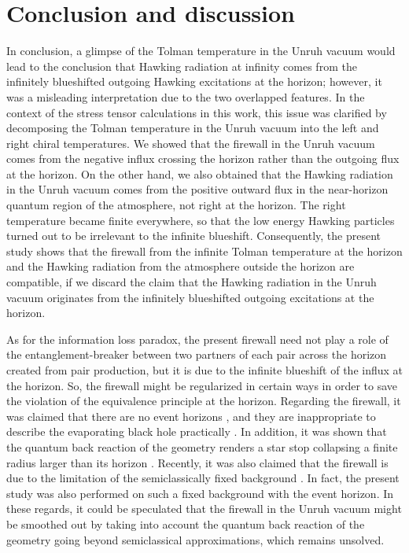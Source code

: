 \documentclass[aps,a4paper,showpacs,showkeys,superscriptaddress,12pt]{revtex4-1}
\begin{document}
\section{Conclusion and discussion}
\label{sec:Diss}
In conclusion, a glimpse of the Tolman temperature in the Unruh vacuum
would lead to the conclusion that
Hawking radiation at infinity comes
from the infinitely blueshifted outgoing Hawking excitations at the horizon;
however, it was a misleading interpretation due to the two overlapped features.
In the context of the stress tensor calculations in this work,
this issue was clarified by decomposing the Tolman temperature in the Unruh vacuum
into the left and right chiral temperatures.
We showed that the firewall
in the Unruh vacuum comes from the negative influx crossing the horizon
rather than the outgoing flux at the horizon.
On the other hand, we also obtained that the Hawking radiation in the Unruh vacuum
comes from the positive
outward flux in the near-horizon quantum region of the atmosphere, not right at the horizon.
The right temperature became finite everywhere, so that
the low energy Hawking particles turned out to be irrelevant to the infinite blueshift.
Consequently,
the present study shows that the firewall from the infinite Tolman temperature at the horizon
and the Hawking radiation from the atmosphere outside the horizon are compatible,
if we discard the claim that the Hawking radiation in the Unruh vacuum
originates from the infinitely blueshifted
outgoing excitations at the horizon.

As for the information loss paradox, the present firewall need not play
a role of the entanglement-breaker between two partners of each pair across the horizon
created from pair production, but it is due to the infinite blueshift of
the influx at the horizon. So,
the firewall might be regularized in certain ways in order
to save the violation of the equivalence principle at the horizon.
Regarding the firewall,
it was claimed that there are no event horizons
\cite{Hawking:2014tga}, and they are inappropriate to describe the evaporating
black hole practically \cite{Visser:2014zqa}.
In addition, it was shown that the quantum back reaction of the geometry
renders a star stop collapsing a finite radius larger than
its horizon \cite{Mersini-Houghton:2014zka, Mersini-Houghton:2014cta}.
Recently, it was also claimed that the firewall is due to the limitation of
the semiclassically fixed background \cite{Nomura:2016qum}.
In fact, the present study was also performed on such a fixed
background with the event horizon.
In these regards, it could be speculated that the firewall in the Unruh vacuum might be
smoothed out by taking into account the quantum back reaction of the geometry
going beyond semiclassical approximations, which remains unsolved.
\end{document}
